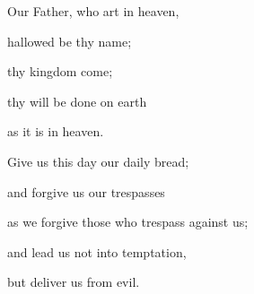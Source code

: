 Our Father, who art in heaven,

hallowed be thy name;

thy kingdom come;

thy will be done on earth

as it is in heaven.

Give us this day our daily bread;

and forgive us our trespasses

as we forgive those who trespass against us;

and lead us not into temptation,

but deliver us from evil.
